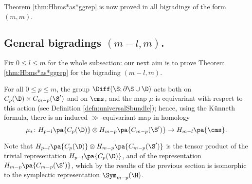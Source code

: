 Theorem \ref{thm:Hbms*as*ggrep} is now proved in all bigradings of the form $(m,m)$.

\subsection{General bigradings $(m-l,m)$.} Fix $0\leq l\leq m$ for the whole subsection: our next aim is to prove Theorem
\ref{thm:Hbms*as*ggrep} for the bigrading $(m-l,m)$.

For all $0\leq p\leq m$, the group $\Diff(\S;\partial\S\cup\D)$ acts both on $C_p(\D)\times C_{m-p}(\S')$
and on $\cms$, and the map $\mu$ is equivariant with respect to this action
(see Definition \ref{defn:universalSbundle});
hence, using the K\"{u}nneth formula, there is an induced $\gg$-equivariant map in homology
\begin{equation}
 \label{eq:mu*}
 \mu_*\colon H_{p-l}\pa{C_p(\D)}\otimes H_{m-p}\pa{C_{m-p}(\S')}\to H_{m-l}\pa{\cms}.
\end{equation}

Note that $H_{p-l}\pa{C_p(\D)}\otimes H_{m-p}\pa{C_{m-p}(\S')}$
is the tensor product of the trivial representation $H_{p-l}\pa{C_p(\D)}$, and
of the representation $H_{m-p}\pa{C_{m-p}(\S')}$, which by the results of the previous
section is isomorphic to the symplectic representation $\Sym_{m-p}(\H)$.

